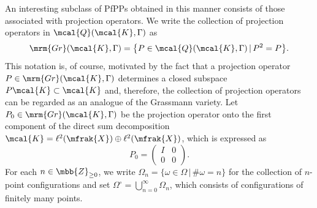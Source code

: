 An interesting subclass of PfPPs obtained in this manner consists of those associated with projection operators.
We write the collection of projection operators in $\mcal{Q}(\mcal{K},\Gamma)$ as
\begin{equation*}
	\mrm{Gr}(\mcal{K},\Gamma)=\big\{P\in\mcal{Q}(\mcal{K},\Gamma)\,|\,P^{2}=P\big\}.
\end{equation*}
This notation is, of course, motivated by the fact that a projection operator $P\in\mrm{Gr}(\mcal{K},\Gamma)$ determines a closed subspace $P\mcal{K}\subset\mcal{K}$ and, therefore, the collection of projection operators can be regarded as an analogue of the Grassmann variety.
Let $P_{0}\in \mrm{Gr}(\mcal{K},\Gamma)$ be the projection operator onto the first component of the direct sum decomposition $\mcal{K}=\ell^{2}(\mfrak{X})\oplus\ell^{2}(\mfrak{X})$, which is expressed as
\begin{equation}
\label{eq:projection_vacuum}
	P_{0}=\left(
	\begin{matrix}
		I & 0 \\
		0 & 0
	\end{matrix}
	\right).
\end{equation}
For each $n\in\mbb{Z}_{\ge 0}$, we write $\Omega_{n}=\{\omega\in \Omega\,|\, \#\omega=n\}$ for the collection of $n$-point configurations and set $\Omega^{\circ}=\bigcup_{n=0}^{\infty}\Omega_{n}$, which consists of configurations of finitely many points.

